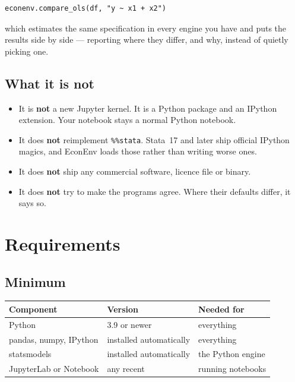 \documentclass[11pt,a4paper]{report}
\begin{document}
\begin{lstlisting}
econenv.compare_ols(df, "y ~ x1 + x2")
\end{lstlisting}

which estimates the same specification in every engine you have and puts the
results side by side --- reporting where they differ, and why, instead of
quietly picking one.

\section{What it is not}

\begin{itemize}
  \item It is \textbf{not} a new Jupyter kernel. It is a Python package and an
        IPython extension. Your notebook stays a normal Python notebook.
  \item It does \textbf{not} reimplement \texttt{\%\%stata}. Stata~17 and later
        ship official IPython magics, and EconEnv loads those rather than
        writing worse ones.
  \item It does \textbf{not} ship any commercial software, licence file or
        binary.
  \item It does \textbf{not} try to make the programs agree. Where their
        defaults differ, it says so.
\end{itemize}

\chapter{Requirements}

\section{Minimum}

\begin{center}
\begin{tabular}{@{}lll@{}}
\toprule
\textbf{Component} & \textbf{Version} & \textbf{Needed for} \\
\midrule
Python & 3.9 or newer & everything \\
pandas, numpy, IPython & installed automatically & everything \\
statsmodels & installed automatically & the Python engine \\
JupyterLab or Notebook & any recent & running notebooks \\
\bottomrule
\end{tabular}
\end{center}
\end{document}
